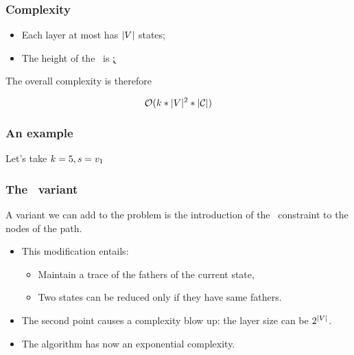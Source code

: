 \begin{frame}
  \frametitle{Complexity}

  \begin{itemize}
    \item Each layer at most has $| V |$ states;
    \item The height of the \mdd\ is \k;
  \end{itemize}

  The overall complexity is therefore
  \begin{center}
    \alert{$$\mathcal{O}(k * | V | ^ 2 * | \mathcal{C} |)$$}
  \end{center}
  
\end{frame}

\begin{frame}
  \frametitle{An example}

  

  Let's take $k = 5, s = v_1$

\end{frame}

\begin{frame}
  \frametitle{The \alldiff\ variant}

  A variant we can add to the problem is the introduction of the \alldiff\ constraint to the nodes of the path.

  \begin{itemize}
    \item This modification entails:
          \begin{itemize}
            \item Maintain a trace of the fathers of the current state,
            \item Two states can be reduced only if they have same fathers.
          \end{itemize}
    \item The second point causes a complexity blow up: the layer size can be $2^{|V|}$.
    \item The algorithm has now an exponential complexity.
  \end{itemize}

\end{frame}

